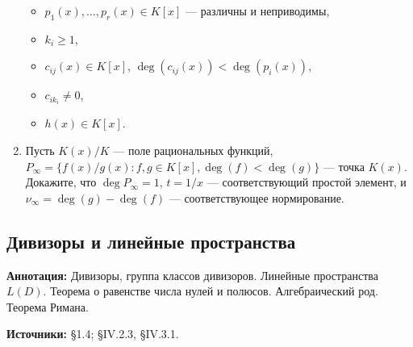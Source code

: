\documentclass[a4paper, 12pt]{article}
\begin{document}
\begin{enumerate}[noitemsep,topsep=0pt]
\begin{itemize}[noitemsep,topsep=0pt]
        \item $p_1(x), \dots, p_r(x)\in K[x]$ --- различны и неприводимы,
        \item $k_i\geqslant 1$,
        \item $c_{ij}(x)\in K[x]$, $\deg(c_{ij}(x))<\deg(p_i(x))$,
        \item $c_{ik_i}\neq 0$,
        \item $h(x)\in K[x]$.
    \end{itemize} %
    \item Пусть $K(x)/K$ --- поле рациональных функций, $P_\infty=\{f(x)/g(x): f,g \in K[x], \deg(f)<\deg(g)\}$ --- точка $K(x)$. Докажите, что $\deg P_\infty = 1$, $t=1/x$ ---  соответствующий простой элемент, и $\nu_\infty = \deg(g) - \deg(f)$ --- соответствующее нормирование. %
\end{enumerate}

\subsection{Дивизоры и линейные пространства}

{\bf Аннотация:} Дивизоры, группа классов дивизоров. Линейные пространства $L(D)$. Теорема о равенстве числа нулей и полюсов. Алгебраический род. Теорема Римана.

{\bf Источники:} \cite{Stich} \S 1.4; \cite{Step} \S IV.2.3, \S IV.3.1.
\end{document}
